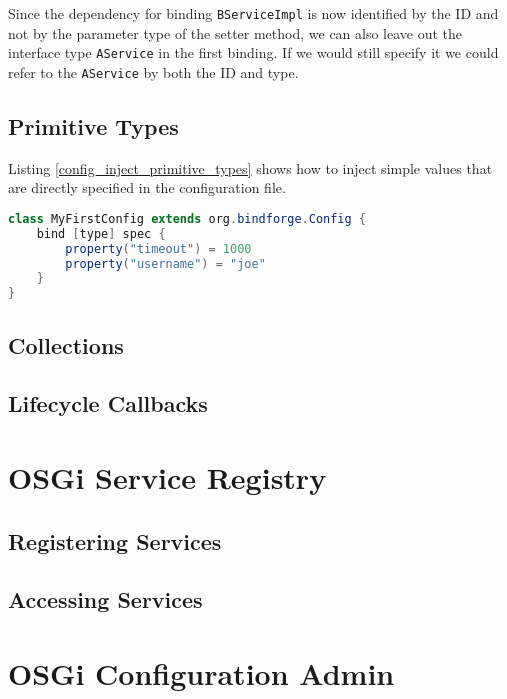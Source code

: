 Since the dependency for binding \verb!BServiceImpl! is now identified by the ID and not by the parameter type of the setter method, we can also leave out the interface type \verb!AService! in the first binding. If we would still specify it we could refer to the \verb!AService! by both the ID and type.

\subsection{Primitive Types}

Listing \ref{config_inject_primitive_types} shows how to inject simple values that are directly specified in the configuration file.

\begin{lstlisting}[caption={Inject primitive types},label=config_inject_primitive_types,language=Java]
class MyFirstConfig extends org.bindforge.Config {
    bind [type] spec {
        property("timeout") = 1000
        property("username") = "joe"
    }
}
\end{lstlisting}

\subsection{Collections}

\subsection{Lifecycle Callbacks}


\section{OSGi Service Registry}

\subsection{Registering Services}

\subsection{Accessing Services}


\section{OSGi Configuration Admin}







